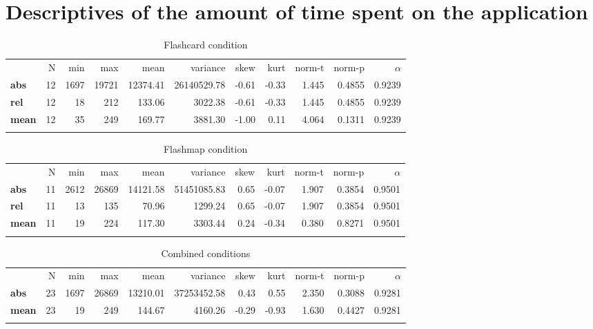 \FloatBarrier
\section{Descriptives of the amount of time spent on the application}

\begin{longtable}[c]{@{}lrrrrrrrrrr@{}}
\caption{Flashcard condition}
\endfirsthead
\toprule\addlinespace
& N & min & max & mean & variance & skew & kurt & norm-t &
norm-p & $\alpha$
\\\addlinespace
\midrule
\textbf{abs} & 12 & 1697 & 19721 & 12374.41 & 26140529.78 & -0.61 &
-0.33 & 1.445 & 0.4855 & 0.9239
\\\addlinespace
\textbf{rel} & 12 & 18 & 212 & 133.06 & 3022.38 & -0.61 & -0.33 & 1.445
& 0.4855 & 0.9239
\\\addlinespace
\textbf{mean} & 12 & 35 & 249 & 169.77 & 3881.30 & -1.00 & 0.11 & 4.064
& 0.1311 & 0.9239
\\\addlinespace
\bottomrule
    \label{tab:time_fc}
\end{longtable}

\begin{longtable}[c]{@{}lrrrrrrrrrr@{}}
\caption{Flashmap condition}
\endfirsthead
\toprule\addlinespace
& N & min & max & mean & variance & skew & kurt & norm-t &
norm-p & $\alpha$
\\\addlinespace
\midrule
\textbf{abs} & 11 & 2612 & 26869 & 14121.58 & 51451085.83 & 0.65 & -0.07
& 1.907 & 0.3854 & 0.9501
\\\addlinespace
\textbf{rel} & 11 & 13 & 135 & 70.96 & 1299.24 & 0.65 & -0.07 & 1.907 &
0.3854 & 0.9501
\\\addlinespace
\textbf{mean} & 11 & 19 & 224 & 117.30 & 3303.44 & 0.24 & -0.34 & 0.380
& 0.8271 & 0.9501
\\\addlinespace
\bottomrule
    \label{tab:time_fm}
\end{longtable}

\begin{longtable}[c]{@{}lrrrrrrrrrr@{}}
\caption{Combined conditions}
\endfirsthead
\toprule\addlinespace
& N & min & max & mean & variance & skew & kurt & norm-t &
norm-p & $\alpha$
\\\addlinespace
\midrule
\textbf{abs} & 23 & 1697 & 26869 & 13210.01 & 37253452.58 & 0.43 & 0.55
& 2.350 & 0.3088 & 0.9281
\\\addlinespace
\textbf{mean} & 23 & 19 & 249 & 144.67 & 4160.26 & -0.29 & -0.93 & 1.630
& 0.4427 & 0.9281
\\\addlinespace
\bottomrule
    \label{tab:time_gen}
\end{longtable}

